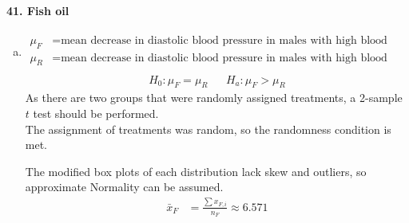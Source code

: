 \documentclass[../Homework]{subfiles}
\begin{document}
		\paragraph{41. Fish oil}
			\begin{enumerate}[a.]
				\item
					\footnotesize\begin{align*}
						\mu_F &= \text{mean decrease in diastolic blood pressure in males with high blood pressure after 4 weeks with fish oil} \\
						\mu_R &= \text{mean decrease in diastolic blood pressure in males with high blood pressure after 4 weeks with regular oil} \\
					\end{align*}
					\begin{align*}
						H_0: \mu_F = \mu_R && H_a: \mu_F > \mu_R
					\end{align*}
					As there are two groups that were randomly assigned treatments, a 2-sample $t$ test should be performed. \\
					The assignment of treatments was random, so the randomness condition is met.
					\begin{center}
					\end{center}
					The modified box plots of each distribution lack skew and outliers, so approximate Normality can be assumed.
					\begin{align*}
						\bar{x}_F &= \frac{\sum x_{F, i}}{n_F} \approx 6.571 \\

\end{align*}
\end{enumerate}
\end{document}
